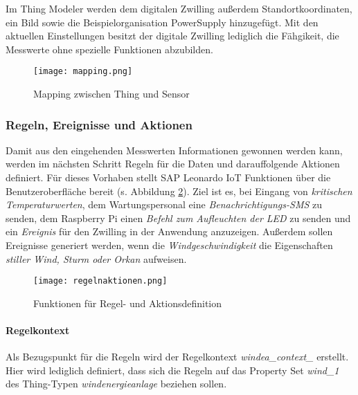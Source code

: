\noindent Im Thing Modeler werden dem digitalen Zwilling außerdem Standortkoordinaten, ein Bild sowie die Beispielorganisation PowerSupply hinzugefügt. Mit den aktuellen Einstellungen besitzt der digitale Zwilling lediglich die Fähgikeit, die Messwerte ohne spezielle Funktionen abzubilden.

\begin{figure} [H]
  \centering
  \texttt{[image: mapping.png]}
  \caption{Mapping zwischen Thing und Sensor}
  \label{mapping}
\end{figure}

\subsubsection{Regeln, Ereignisse und Aktionen}
Damit aus den eingehenden Messwerten Informationen gewonnen werden kann, werden im nächsten Schritt Regeln für die Daten und darauffolgende Aktionen definiert. Für dieses Vorhaben stellt SAP Leonardo IoT Funktionen über die Benutzeroberfläche bereit (s. Abbildung \ref{ruleaction}). Ziel ist es, bei Eingang von \textit{kritischen Temperaturwerten}, dem Wartungspersonal eine \textit{Benachrichtigungs-SMS} zu senden, dem Raspberry Pi einen \textit{Befehl zum Aufleuchten der LED} zu senden und ein \textit{Ereignis} für den Zwilling in der Anwendung anzuzeigen. Außerdem sollen Ereignisse generiert werden, wenn die \textit{Windgeschwindigkeit} die Eigenschaften \textit{stiller Wind, Sturm oder Orkan} aufweisen.

\begin{figure} [H]
  \centering
  \texttt{[image: regelnaktionen.png]}
  \caption{Funktionen für Regel- und Aktionsdefinition}
  \label{ruleaction}
\end{figure}

\paragraph{Regelkontext}
Als Bezugspunkt für die Regeln wird der Regelkontext \textit{windea\_context\_} erstellt. Hier wird lediglich definiert, dass sich die Regeln auf das Property Set \textit{wind\_1} des Thing-Typen \textit{windenergieanlage} beziehen sollen.

